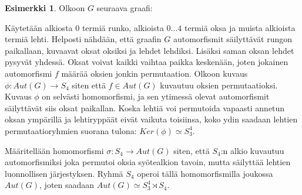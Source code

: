 \documentclass[a4paper, 12pt]{article}
\theoremstyle{definition}
\newtheorem{example}[mydef]{Esimerkki}
\theoremstyle{plain}
\begin{document}
\begin{example}
Olkoon $G$ seuraava graafi:

\begin{center}
\end{center}

Käytetään alkiosta $0$ termiä runko, alkioista $0 \dots 4$ termiä oksa ja muista alkioista termiä lehti. Helposti nähdään, että graafin $G$ automorfismit säilyttävät rungon paikallaan, kuvaavat oksat oksiksi ja lehdet lehdiksi. Lisäksi saman oksan lehdet pysyvät yhdessä. Oksat voivat kaikki vaihtaa paikka keskenään, joten jokainen automorfismi $f$ määrää oksien jonkin permutaation. 
Olkoon kuvaus $\phi: Aut(G) \rightarrow S_4$ siten että $f \in Aut(G)$ kuvautuu oksien permutaatioksi. Kuvaus $\phi$ on selvästi homomorfismi, ja sen ytimessä olevat automorfismit säilyttävät siis oksat paikallan. Koska lehtiä voi permutoida vapaasti annetun oksan ympärillä ja lehtiryppäät eivät vaikuta toisiinsa, koko ydin saadaan lehtien permutaatioryhmien suorana tulona: $Ker(\phi) \simeq S_3^4$. 

Määritellään homomorfismi $\sigma: S_4 \rightarrow Aut(G)$ siten, että $S_4$:n alkio kuvautuu automorfismiksi joka permutoi oksia syötealkion tavoin, mutta säilyttää lehtien luonnollisen järjestyksen. Ryhmä $S_4$ operoi tällä homomorfismilla joukossa $Aut(G)$, joten saadaan $Aut(G) \simeq S_3^4 \rtimes S_4$.
\end{example}
\end{document}
